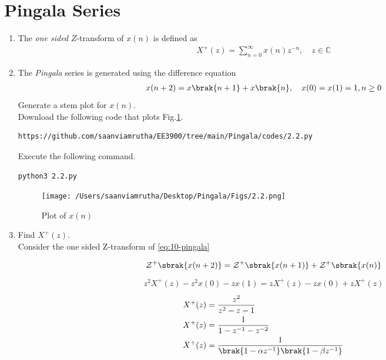 \documentclass[journal,12pt,twocolumn]{IEEEtran}
\renewcommand\thesection{\arabic{section}}
\begin{document}
\section{Pingala Series}
\begin{enumerate}[label=\thesection.\arabic*,ref=\thesection.\theenumi]
\item The {\em one sided} $Z$-transform of $x(n)$ is defined as 
\begin{align}
X^{+}(z) = \sum_{n = 0}^{\infty}x(n)z^{-n}, \quad z \in \mathbb{C} \label{eq:one-Z}
\end{align}

\item The {\em Pingala} series is generated using the difference equation 
\begin{align}
	x(n+2) = x\brak{n+1} + x\brak{n},  \quad x(0) = x(1) = 1, n \ge 0
	\label{eq:10-pingala}
\end{align}
Generate a stem plot for $x(n)$.\\
\solution Download the following code that plots Fig.\ref{fig:2.2}.
\begin{lstlisting}
https://github.com/saanviamrutha/EE3900/tree/main/Pingala/codes/2.2.py
\end{lstlisting}
Execute the following command.
\begin{lstlisting}
python3 2.2.py
\end{lstlisting}
\begin{figure}[!ht]
\centering
\texttt{[image: /Users/saanviamrutha/Desktop/Pingala/Figs/2.2.png]}
\caption{Plot of $x(n)$}
\label{fig:2.2}
\end{figure}


\item  Find $X^{+}(z)$.\\
\solution Consider the one sided Z-transform of \eqref{eq:10-pingala}

\begin{align}
\mathcal{Z}^{+}\sbrak{x(n+2)} = \mathcal{Z}^{+}\sbrak{x(n+1)} + \mathcal{Z}^{+}\sbrak{x(n)}
\end{align}
\begin{align}
z^2X^{+}(z) - z^2x(0) - zx(1) = zX^{+}(z) - zx(0) + zX^{+}(z)
\end{align}
\begin{align}
X^{+}(z) &= \frac{z^2}{z^2 - z - 1}\\
X^{+}(z) &= \frac{1}{1-z^{-1}-z^{-2}}\\ X^{+}(z) &= \frac{1}{\brak{1-\alpha z^{-1}}\brak{1-\beta z^{-1}}}
\label{eq - X^{+}(z)}
\end{align}


\end{enumerate}
\end{document}
